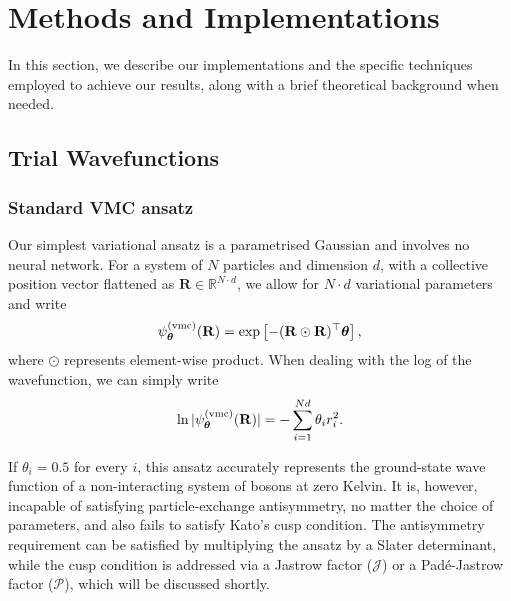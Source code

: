 \chapter{Methods and Implementations}\label{chap:methods}

In this section, we describe our implementations and the specific techniques employed to achieve our results, along with a brief theoretical background when needed.

\section{Trial Wavefunctions}\label{sec:ansatz_closer_view}

\subsection{Standard VMC ansatz}

Our simplest variational ansatz is a parametrised Gaussian and involves no neural network. For a system of $N$ particles and dimension $d$, with a collective position vector flattened as $\mathbf{R} \in \mathbb{R}^{N\cdot d}$, we allow for $N\cdot d$ variational parameters and write
\begin{align}
    \psi_{\boldsymbol{\theta}}^{(\text{vmc})}(\mathbf{R}) = \exp\left[-(\mathbf{R} \odot \mathbf{R})^\top\boldsymbol{\theta} \right],
    \label{eq:met:single_particle_wf}
\end{align}
where $\odot$ represents element-wise product. When dealing with the log of the wavefunction, we can simply write
\begin{equation*}
    \ln|\psi^{(\text{vmc})}_{\boldsymbol{\theta}}(\mathbf{R})| = -\sum_{i=1}^{N d}\theta_i r_i^2.
    \label{eq:met:logsingle_particle_wf}
\end{equation*}

If $\theta_i = 0.5$ for every $i$, this ansatz accurately represents the ground-state wave function of a non-interacting system of bosons at zero Kelvin. It is, however, incapable of satisfying particle-exchange antisymmetry, no matter the choice of parameters, and also fails to satisfy Kato's cusp condition. The antisymmetry requirement can be satisfied by multiplying the ansatz by a Slater determinant, while the cusp condition is addressed via a Jastrow factor ($\mathcal{J}$) or a Padé-Jastrow factor ($\mathcal{P}$), which will be discussed shortly.

